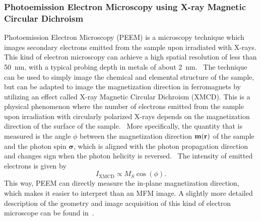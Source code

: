 \documentclass[10pt,a4paper]{article}
\renewcommand{\vec}[1]{\boldsymbol{#1}}
\begin{document}
\subsubsection{Photoemission Electron Microscopy using X-ray Magnetic Circular Dichroism}
Photoemission Electron Microscopy (PEEM) is a microscopy technique which images secondary electrons emitted from the sample upon irradiated with X-rays. This kind of electron microscopy can achieve a high spatial resolution of less than \SI{50}{\nano\metre}, with a typical probing depth in metals of about \SI{2}{\nano\metre}.~\cite{PEEM} The technique can be used to simply image the chemical and elemental structure of the sample, but can be adapted to image the magnetization direction in ferromagnets by utilizing an effect called X-ray Magnetic Circular Dichroism (XMCD). This is a physical phenomenon where the number of electrons emitted from the sample upon irradiation with circularly polarized X-rays depends on the magnetization direction of the surface of the sample.~\cite{NML_Carlton} More specifically, the quantity that is measured is the angle $\phi$ between the magnetization direction $\vb{m(\vb{r})}$ of the sample and the photon spin $\vec{\sigma}$, which is aligned with the photon propagation direction and changes sign when the photon helicity is reversed.~\cite{PEEM} The intensity of emitted electrons is given by
\begin{equation}
    I_{\mathrm{XMCD}} \propto M_S \cos(\phi) \mathrm{.}
    \label{eq:XMCD}
\end{equation}
This way, PEEM can directly measure the in-plane magnetization direction, which makes it easier to interpret than an MFM image. A slightly more detailed description of the geometry and image acquisition of this kind of electron microscope can be found in~\cite{PEEM}. %
\end{document}
